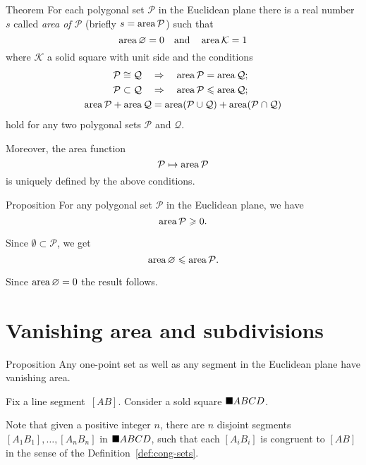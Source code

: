 \begin{thm}{Theorem}\label{thm:area}
For each polygonal set $\mathcal{P}$ in the Euclidean plane 
there is a real number $s$ 
called \emph{area of $\mathcal{P}$} 
(briefly $s=\mathop{\rm area}\nolimits \mathcal{P}$) such that 
\[\mathop{\rm area}\nolimits\varnothing=0
\quad
\text{and}
\quad
\mathop{\rm area}\nolimits\mathcal{K}=1\]
where  $\mathcal{K}$ a solid square with unit side
and the conditions
\begin{align*}
\mathcal{P}\cong\mathcal{Q}
\quad 
&\Rightarrow
\quad \mathop{\rm area}\nolimits\mathcal{P}=\mathop{\rm area}\nolimits\mathcal{Q};
\\
\mathcal{P}\subset\mathcal{Q}
\quad
&\Rightarrow
\quad 
\mathop{\rm area}\nolimits\mathcal{P}\leqslant\mathop{\rm area}\nolimits\mathcal{Q};
\\
\mathop{\rm area}\nolimits\mathcal{P}+\mathop{\rm area}\nolimits\mathcal{Q}
&=
\mathop{\rm area}\nolimits(\mathcal{P}\cup\mathcal{Q})+\mathop{\rm area}\nolimits(\mathcal{P}\cap\mathcal{Q})
\end{align*}
hold 
for any two polygonal sets $\mathcal{P}$ and $\mathcal{Q}$.

Moreover, the area function 
\[\mathcal{P}\mapsto \mathop{\rm area}\nolimits \mathcal{P}\]
is uniquely defined by the above conditions.
\end{thm}

\begin{thm}{Proposition}\label{prop:area-positive}
For any polygonal set $\mathcal{P}$ in the Euclidean plane, 
we have
\[\mathop{\rm area}\nolimits\mathcal{P}\geqslant 0.\]

\end{thm}

Since $\emptyset \subset \mathcal{P}$,
we get
\[\mathop{\rm area}\nolimits\varnothing\leqslant \mathop{\rm area}\nolimits\mathcal{P}.\]

Since $\mathop{\rm area}\nolimits\varnothing=0$ the result follows.\qeds



\section*{Vanishing area and subdivisions}

\begin{thm}{Proposition}\label{prop:area-segment}
Any one-point set as well as any segment in the Euclidean plane have  vanishing area.
\end{thm}

Fix a line segment~$[AB]$.
Consider a sold square $\blacksquare ABCD$.

Note that given a positive integer $n$,
there are $n$ disjoint segments $[A_1B_1],\dots,[A_nB_n]$ 
in $\blacksquare ABCD$,
such that each $[A_iB_i]$ is congruent to $[AB]$ in the sense of the Definition~\ref{def:cong-sets}.


